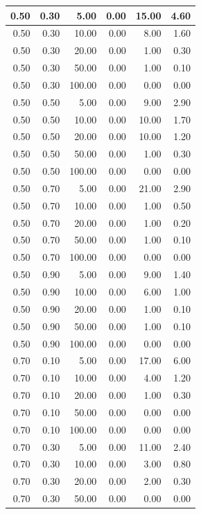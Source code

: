 \documentclass{bmstu}
\begin{document}
\begin{longtable}{|r|r|r|r|r|r|}
0.50 & 0.30 & 5.00 & 0.00 & 15.00 & 4.60 \\ \hline
0.50 & 0.30 & 10.00 & 0.00 & 8.00 & 1.60 \\ \hline
0.50 & 0.30 & 20.00 & 0.00 & 1.00 & 0.30 \\ \hline
0.50 & 0.30 & 50.00 & 0.00 & 1.00 & 0.10 \\ \hline
0.50 & 0.30 & 100.00 & 0.00 & 0.00 & 0.00 \\ \hline
0.50 & 0.50 & 5.00 & 0.00 & 9.00 & 2.90 \\ \hline
0.50 & 0.50 & 10.00 & 0.00 & 10.00 & 1.70 \\ \hline
0.50 & 0.50 & 20.00 & 0.00 & 10.00 & 1.20 \\ \hline
0.50 & 0.50 & 50.00 & 0.00 & 1.00 & 0.30 \\ \hline
0.50 & 0.50 & 100.00 & 0.00 & 0.00 & 0.00 \\ \hline
0.50 & 0.70 & 5.00 & 0.00 & 21.00 & 2.90 \\ \hline
0.50 & 0.70 & 10.00 & 0.00 & 1.00 & 0.50 \\ \hline
0.50 & 0.70 & 20.00 & 0.00 & 1.00 & 0.20 \\ \hline
0.50 & 0.70 & 50.00 & 0.00 & 1.00 & 0.10 \\ \hline
0.50 & 0.70 & 100.00 & 0.00 & 0.00 & 0.00 \\ \hline
0.50 & 0.90 & 5.00 & 0.00 & 9.00 & 1.40 \\ \hline
0.50 & 0.90 & 10.00 & 0.00 & 6.00 & 1.00 \\ \hline
0.50 & 0.90 & 20.00 & 0.00 & 1.00 & 0.10 \\ \hline
0.50 & 0.90 & 50.00 & 0.00 & 1.00 & 0.10 \\ \hline
0.50 & 0.90 & 100.00 & 0.00 & 0.00 & 0.00 \\ \hline
0.70 & 0.10 & 5.00 & 0.00 & 17.00 & 6.00 \\ \hline
0.70 & 0.10 & 10.00 & 0.00 & 4.00 & 1.20 \\ \hline
0.70 & 0.10 & 20.00 & 0.00 & 1.00 & 0.30 \\ \hline
0.70 & 0.10 & 50.00 & 0.00 & 0.00 & 0.00 \\ \hline
0.70 & 0.10 & 100.00 & 0.00 & 0.00 & 0.00 \\ \hline
0.70 & 0.30 & 5.00 & 0.00 & 11.00 & 2.40 \\ \hline
0.70 & 0.30 & 10.00 & 0.00 & 3.00 & 0.80 \\ \hline
0.70 & 0.30 & 20.00 & 0.00 & 2.00 & 0.30 \\ \hline
0.70 & 0.30 & 50.00 & 0.00 & 0.00 & 0.00 \\ \hline

\end{longtable}
\end{document}
